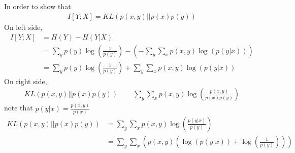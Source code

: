 \documentclass{article}
\begin{document}
\subsection{}
In order to show that
\begin{align*}
    I[Y;X] = KL(p(x,y)||p(x)p(y))
\end{align*}
On left side,
\begin{align*}
    I[Y;X] &= H(Y) - H(Y|X)\\
    &= \sum_{y}p(y)\log(\frac{1}{p(y)}) - (-\sum_{y}\sum_{x}p(x,y)\log(p(y|x)))\\
    &= \sum_{y}p(y)\log(\frac{1}{p(y)}) + \sum_{y}\sum_{x}p(x,y)\log(p(y|x))
\end{align*}
On right side,
\begin{align*}
    KL(p(x,y)||p(x)p(y)) &= \sum_{y}\sum_{x} p(x,y)\log(\frac{p(x,y)}{p(x)p(y)})
\end{align*}
note that $p(y|x) =\frac{p(x,y)}{p(x)}$
\begin{align*}
    KL(p(x,y)||p(x)p(y)) &= \sum_{y}\sum_{x} p(x,y)\log(\frac{p(y|x)}{p(y)})\\
    &= \sum_{y}\sum_{x} (p(x,y)(\log(p(y|x))+\log(\frac{1}{p(y)})))
\end{align*}
\end{document}

